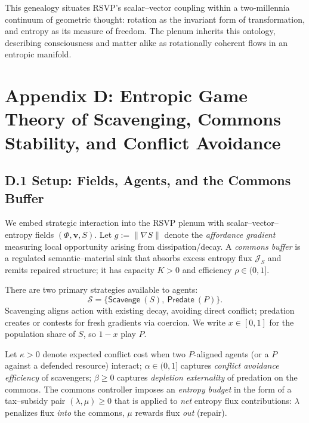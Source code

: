 \documentclass[11pt,a4paper,titlepage]{article}
\theoremstyle{definition}
\begin{document}
This genealogy situates RSVP’s scalar–vector coupling within
a two-millennia continuum of geometric thought:
rotation as the invariant form of transformation,
and entropy as its measure of freedom.
The plenum inherits this ontology, describing consciousness and matter alike
as rotationally coherent flows in an entropic manifold.


\section*{Appendix D: Entropic Game Theory of Scavenging, Commons Stability, and Conflict Avoidance}
\label{app:entropic_game}

\subsection*{D.1 Setup: Fields, Agents, and the Commons Buffer}

We embed strategic interaction into the RSVP plenum with scalar--vector--entropy fields $(\Phi,\mathbf{v},S)$.
Let $g := \|\nabla S\|$ denote the \emph{affordance gradient} measuring local opportunity arising from dissipation/decay.
A \emph{commons buffer} is a regulated semantic--material sink that absorbs excess entropy flux $\mathcal{J}_S$ and remits repaired structure; it has capacity $K>0$ and efficiency $\rho\in(0,1]$.

There are two primary strategies available to agents:
\[
\mathcal{S}=\{\textsf{Scavenge}~(S),~\textsf{Predate}~(P)\}.
\]
Scavenging aligns action with existing decay, avoiding direct conflict; predation creates or contests for fresh gradients via coercion. We write $x\in[0,1]$ for the population share of $S$, so $1-x$ play $P$.

Let $\kappa>0$ denote expected conflict cost when two $P$-aligned agents (or a $P$ against a defended resource) interact; $\alpha\in(0,1]$ captures \emph{conflict avoidance efficiency} of scavengers; $\beta\ge 0$ captures \emph{depletion externality} of predation on the commons. The commons controller imposes an \emph{entropy budget} in the form of a tax--subsidy pair $(\lambda,\mu)\ge 0$ that is applied to \emph{net} entropy flux contributions: $\lambda$ penalizes flux \emph{into} the commons, $\mu$ rewards flux \emph{out} (repair).
\end{document}
